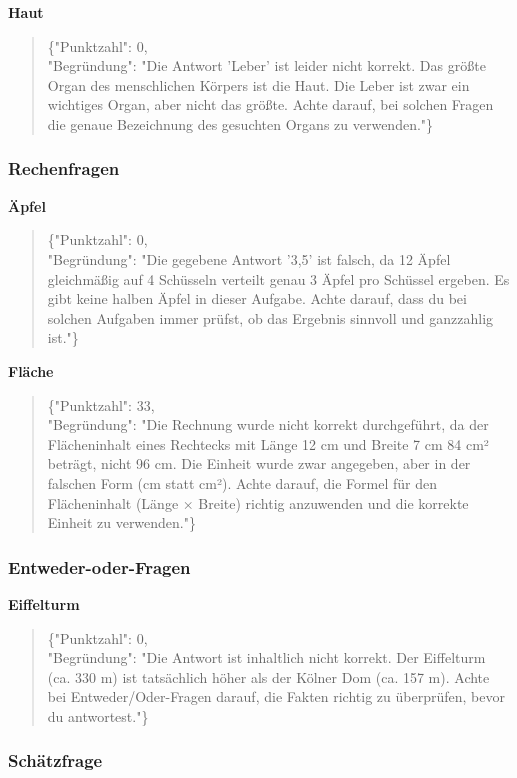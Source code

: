 \documentclass[a4paper,12pt]{article}
\begin{document}
\textbf{Haut}
\begin{quote}
\{"Punktzahl": 0,\\
"Begründung": "Die Antwort 'Leber' ist leider nicht korrekt. Das größte Organ des menschlichen Körpers ist die Haut. Die Leber ist zwar ein wichtiges Organ, aber nicht das größte. Achte darauf, bei solchen Fragen die genaue Bezeichnung des gesuchten Organs zu verwenden."\}
\end{quote}

\subsubsection{Rechenfragen}

\textbf{Äpfel}
\begin{quote}
\{"Punktzahl": 0,\\
"Begründung": "Die gegebene Antwort '3,5' ist falsch, da 12 Äpfel gleichmäßig auf 4 Schüsseln verteilt genau 3 Äpfel pro Schüssel ergeben. Es gibt keine halben Äpfel in dieser Aufgabe. Achte darauf, dass du bei solchen Aufgaben immer prüfst, ob das Ergebnis sinnvoll und ganzzahlig ist."\}
\end{quote}

\textbf{Fläche}
\begin{quote}
\{"Punktzahl": 33,\\
"Begründung": "Die Rechnung wurde nicht korrekt durchgeführt, da der Flächeninhalt eines Rechtecks mit Länge 12 cm und Breite 7 cm 84 cm² beträgt, nicht 96 cm. Die Einheit wurde zwar angegeben, aber in der falschen Form (cm statt cm²). Achte darauf, die Formel für den Flächeninhalt (Länge × Breite) richtig anzuwenden und die korrekte Einheit zu verwenden."\}
\end{quote}

\subsubsection{Entweder-oder-Fragen}

\textbf{Eiffelturm}
\begin{quote}
\{"Punktzahl": 0,\\
"Begründung": "Die Antwort ist inhaltlich nicht korrekt. Der Eiffelturm (ca. 330 m) ist tatsächlich höher als der Kölner Dom (ca. 157 m). Achte bei Entweder/Oder-Fragen darauf, die Fakten richtig zu überprüfen, bevor du antwortest."\}
\end{quote}

\subsubsection{Schätzfrage}
\end{document}
